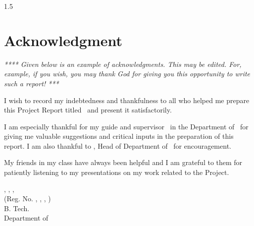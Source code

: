 \newpage
{}
\thispagestyle{empty}
\begin{spacing}{1.5}
%
\chapter*{Acknowledgment}

\textit { **** Given below is an example of acknowledgments. This may be edited. For, example, if you wish, you may thank God for giving you this opportunity to write such a report! *** } 



I wish to record my indebtedness and thankfulness 
to all who helped me prepare this Project Report titled 
{\bfseries \vtitle}\  and present it satisfactorily. 

I am especially thankful for my 
guide and supervisor \vguide\  in the Department of \vdept\  
for giving me valuable suggestions and 
critical inputs in the preparation of this report. 
I am also thankful to \vhod, Head of Department of  \vdept\  
for encouragement. 

My friends in my class have always been 
helpful and I am grateful to them for 
patiently listening to my presentations on my work related to the Project. \\[1cm]



\begin{flushright}
\vnameone, \vnametwo, \vnamethree, \vnamefour\\
(Reg. No. \vregisternumberone, \vregisternumbertwo, \vregisternumberthree, \vregisternumberfour)\\
B. Tech.\\
Department of \vdept\\
\vcollege
\end{flushright}



\end{spacing}  